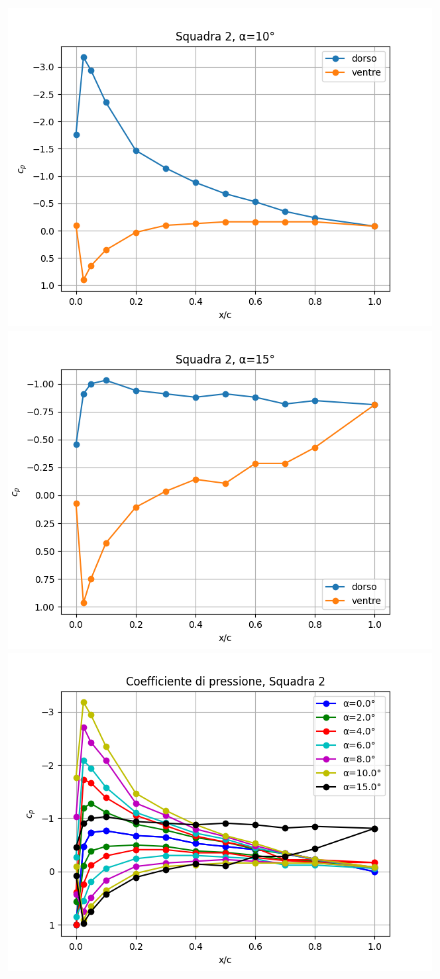 \begin{figure}[H]
    \includegraphics[width=.49\textwidth]{images/5/cp2 a=10.png}
    \includegraphics[width=.49\textwidth]{images/5/cp2 a=15.png}
    \includegraphics[width=.49\textwidth]{images/5/cp2.png}
\end{figure}
